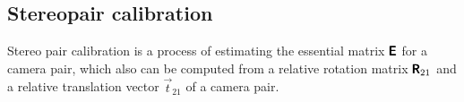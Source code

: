 \subsection{Stereopair calibration}
\label{sec:prelimin_stereocalib}
Stereo pair calibration is a process of estimating the essential matrix $\pmb{\mathsf{E}}$ for a camera pair, which also can be computed from a relative rotation matrix $\pmb{\mathsf{R}}_{21}$ and a relative translation vector $\vec{t}_{21}$ of a camera pair.
